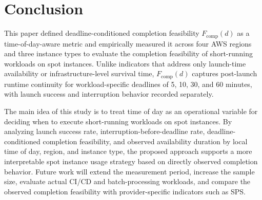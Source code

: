 \documentclass[runningheads]{llncs}
\begin{document}
\section{Conclusion}

This paper defined deadline-conditioned completion feasibility $F_{\mathrm{comp}}(d)$ as a time-of-day-aware metric and empirically measured it across four AWS regions and three instance types to evaluate the completion feasibility of short-running workloads on spot instances. Unlike indicators that address only launch-time availability or infrastructure-level survival time, $F_{\mathrm{comp}}(d)$ captures post-launch runtime continuity for workload-specific deadlines of 5, 10, 30, and 60 minutes, with launch success and interruption behavior recorded separately.

The main idea of this study is to treat time of day as an operational variable for deciding when to execute short-running workloads on spot instances. By analyzing launch success rate, interruption-before-deadline rate, deadline-conditioned completion feasibility, and observed availability duration by local time of day, region, and instance type, the proposed approach supports a more interpretable spot instance usage strategy based on directly observed completion behavior. Future work will extend the measurement period, increase the sample size, evaluate actual CI/CD and batch-processing workloads, and compare the observed completion feasibility with provider-specific indicators such as SPS.
\end{document}
